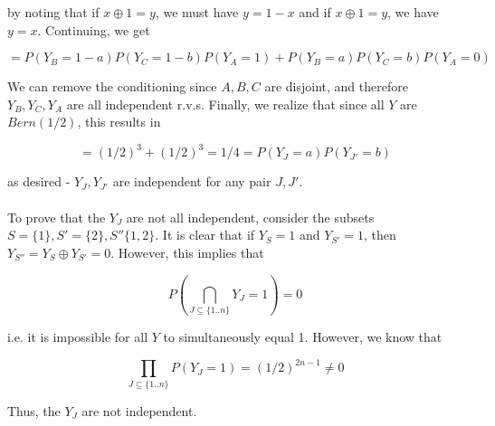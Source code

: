 \begin{enumerate}[label=(\alph*)]
by noting that if \(x \oplus 1 = y\), we must have \(y = 1-x\) and if \(x \oplus 1 = y\), we have \(y=x\). Continuing, we get

\[ = P(Y_{B} = 1-a)P(Y_{C}=1-b)P(Y_{A}=1) + P(Y_{B} = a)P(Y_{C}=b)P(Y_{A}=0)\]

We can remove the conditioning since \(A, B, C\) are disjoint, and therefore \(Y_{B}, Y_{C}, Y_{A}\) are all independent r.v.s. Finally, we realize that since all \(Y\) are \(Bern(1/2)\), this results in

\[ = (1/2)^3+(1/2)^3 = 1/4 = P(Y_{J} = a)P(Y_{J'}=b)\]

as desired - \(Y_{J}, Y_{J'}\) are independent for any pair \(J, J'\). \\\\

To prove that the \(Y_{J}\) are not all independent, consider the subsets \(S=\{1\}, S'=\{2\}, S''\{1,2\}\). It is clear that if \(Y_{S} = 1\) and \(Y_{S'}=1\), then \(Y_{S''} = Y_{S} \oplus Y_{S'} = 0\). However, this implies that 

\[P(\bigcap_{J \subseteq \{1..n\}}Y_{J}=1) = 0\]

i.e. it is impossible for all \(Y\) to simultaneously equal 1. However, we know that

\[\prod_{J \subseteq \{1..n\}}P(Y_{J}=1) = (1/2)^{2n-1} \neq 0\]

Thus, the \(Y_{J}\) are not independent.

\end{enumerate}
